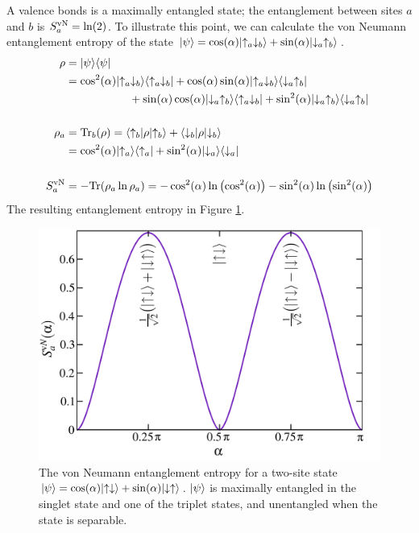 A valence bonds is a maximally entangled state; the entanglement between sites $a$ and $b$ is $S^{\rm vN}_a = \ln(2)$.  To illustrate this point, we can calculate the von Neumann entanglement entropy of the state 
$\lvert {\psi} \rangle=\cos(\alpha)\lvert {\uparrow_a \downarrow_b} \rangle + \sin(\alpha)\lvert {\downarrow_a \uparrow_b} \rangle $.
\begin{align}
\rho &= \lvert {\psi} \rangle\langle {\psi} \rvert \\
&= \cos^2(\alpha)\lvert {\uparrow_a \downarrow_b} \rangle\langle {\uparrow_a \downarrow_b} \rvert + \nonumber
	\cos(\alpha)\sin(\alpha)\lvert {\uparrow_a \downarrow_b} \rangle\langle {\downarrow_a \uparrow_b} \rvert  \\ 
	& \hspace{2cm}+\sin(\alpha)\cos(\alpha)\lvert {\downarrow_a \uparrow_b} \rangle\langle {\uparrow_a \downarrow_b} \rvert + 
	\sin^2(\alpha)\lvert {\downarrow_a \uparrow_b} \rangle\langle {\downarrow_a \uparrow_b} \rvert \\ \nonumber \\ 
\rho_a &={\rm Tr}_b(\rho) = \langle {\uparrow_b} \rvert \rho \lvert {\uparrow_b} \rangle +  \langle {\downarrow_b} \rvert \rho \lvert {\downarrow_b} \rangle  \\
	&= \cos^2(\alpha)\lvert {\uparrow_a} \rangle\langle {\uparrow_a} \rvert + 
	\sin^2(\alpha)\lvert {\downarrow_a} \rangle\langle {\downarrow_a} \rvert \\ \nonumber \\ 
S^{\rm vN}_a &= -{\rm Tr}(\rho_a \ln \rho_a) = -  \cos^2(\alpha) \ln \left( \cos^2(\alpha) \right)
			 -  \sin^2(\alpha) \ln \left( \sin^2(\alpha) \right)
\end{align}
The resulting entanglement entropy in Figure \ref{tent}.
\begin{figure}
	\centering
	 \includegraphics[width=5in]{./figures/made/tent.pdf}
	 \caption[von Neumann entanglement entropy for a two-site state]{
	 	The von Neumann entanglement entropy for a two-site state
		$\lvert {\psi} \rangle=\cos(\alpha)\lvert {\uparrow\downarrow} \rangle + \sin(\alpha)\lvert {\downarrow\uparrow} \rangle$.
		$\lvert {\psi} \rangle$ is maximally entangled in the singlet state and one of the triplet states, 
		and unentangled when the state is separable.
	 }
	 \label{tent}
\end{figure}


